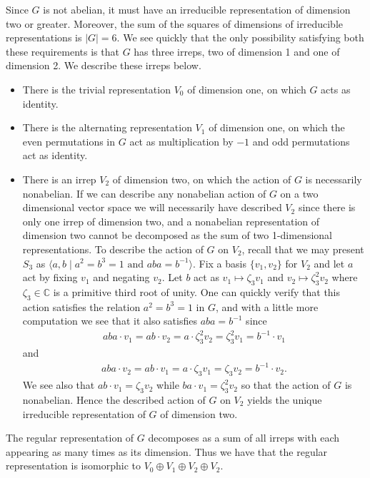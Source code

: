\documentclass[11pt]{article}
\newcommand{\C}{\mathbb{C}}
\begin{document}
Since $G$ is not abelian, it must have an irreducible representation of dimension two or greater. Moreover, the sum of the squares of dimensions of irreducible representations is $|G| = 6$. We see quickly that the only possibility satisfying both these requirements is that $G$ has three irreps, two of dimension 1 and one of dimension 2. We describe these irreps below.\begin{itemize}
\item There is the trivial representation $V_0$ of dimension one, on which $G$ acts as identity.
\item There is the alternating representation $V_1$ of dimension one, on which the even permutations in $G$ act as multiplication by $-1$ and odd permutations act as identity.
\item There is an irrep $V_2$ of dimension two, on which the action of $G$ is necessarily nonabelian. If we can describe any nonabelian action of $G$ on a two dimensional vector space we will necessarily have described $V_2$ since there is only one irrep of dimension two, and a nonabelian representation of dimension two cannot be decomposed as the sum of two 1-dimensional representations. To describe the action of $G$ on $V_2$, recall that we may present $S_3$ as $\langle a,b\mid a^2 = b^3 = 1\text{ and } aba = b^{-1}\rangle$. Fix a basis $\{v_1,v_2\}$ for $V_2$ and let $a$ act by fixing $v_1$ and negating $v_2$. Let $b$ act as $v_1\mapsto \zeta_3 v_1$ and $v_2\mapsto \zeta_3^2v_2$ where $\zeta_3\in \C$ is a primitive third root of unity. One can quickly verify that this action satisfies the relation $a^2=b^3 = 1$ in $G$, and with a little more computation we see that it also satisfies $aba = b^{-1}$ since \begin{align*}
aba\cdot v_1 = ab\cdot v_2 = a\cdot \zeta_3^2v_2 = \zeta_3^2 v_1 = b^{-1}\cdot v_1
\end{align*}
and \begin{align*}
aba\cdot v_2 = ab\cdot v_1 = a\cdot \zeta_3 v_1 = \zeta_3v_2= b^{-1}\cdot v_2.
\end{align*}
We see also that $ab\cdot v_1 = \zeta_3v_2$ while $ba\cdot v_1 = \zeta_3^2v_2$ so that the action of $G$ is nonabelian. Hence the described action of $G$ on $V_2$ yields the unique irreducible representation of $G$ of dimension two.
\end{itemize}
The regular representation of $G$ decomposes as a sum of all irreps with each appearing as many times as its dimension. Thus we have that the regular representation is isomorphic to $V_0\oplus V_1\oplus V_2\oplus V_2$.\\\\
\end{document}
